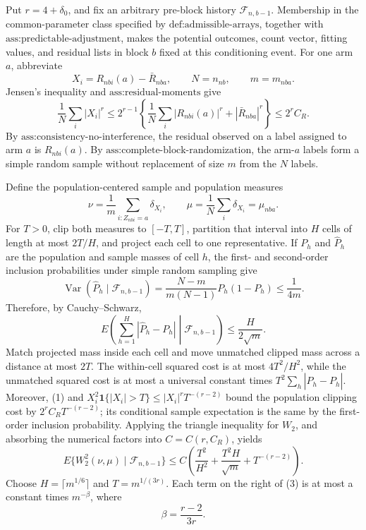 Put \(r=4+\delta_0\), and fix an arbitrary pre-block history \(\mathcal F_{n,b-1}\). Membership in the common-parameter class specified by \(\text{def:admissible-arrays}\), together with \(\text{ass:predictable-adjustment}\), makes the potential outcomes, count vector, fitting values, and residual lists in block \(b\) fixed at this conditioning event. For one arm \(a\), abbreviate
\[
X_i=R_{nbi}(a)-\bar R_{nba},\qquad N=n_{nb},\qquad m=m_{nba}.
\]
Jensen's inequality and \(\text{ass:residual-moments}\) give
\[
\frac1N\sum_i|X_i|^r
\le 2^{r-1}\left\{\frac1N\sum_i|R_{nbi}(a)|^r+|\bar R_{nba}|^r\right\}
\le 2^r C_R.
\tag{1}
\]
By \(\text{ass:consistency-no-interference}\), the residual observed on a label assigned to arm \(a\) is \(R_{nbi}(a)\). By \(\text{ass:complete-block-randomization}\), the arm-\(a\) labels form a simple random sample without replacement of size \(m\) from the \(N\) labels.

Define the population-centered sample and population measures
\[
\nu=\frac1m\sum_{i:Z_{nbi}=a}\delta_{X_i},
\qquad
\mu=\frac1N\sum_i\delta_{X_i}=\mu_{nba}.
\]
For \(T>0\), clip both measures to \([-T,T]\), partition that interval into \(H\) cells of length at most \(2T/H\), and project each cell to one representative. If \(P_h\) and \(\widehat P_h\) are the population and sample masses of cell \(h\), the first- and second-order inclusion probabilities under simple random sampling give
\[
\operatorname{Var}(\widehat P_h\mid\mathcal F_{n,b-1})
=\frac{N-m}{m(N-1)}P_h(1-P_h)\le\frac1{4m}.
\]
Therefore, by Cauchy--Schwarz,
\[
E\left(\sum_{h=1}^H|\widehat P_h-P_h|\middle|\mathcal F_{n,b-1}\right)
\le\frac{H}{2\sqrt m}.
\tag{2}
\]
Match projected mass inside each cell and move unmatched clipped mass across a distance at most \(2T\). The within-cell squared cost is at most \(4T^2/H^2\), while the unmatched squared cost is at most a universal constant times \(T^2\sum_h|\widehat P_h-P_h|\). Moreover, (1) and
\(X_i^2\mathbf 1\{|X_i|>T\}\le |X_i|^rT^{-(r-2)}\) bound the population clipping cost by \(2^rC_RT^{-(r-2)}\); its conditional sample expectation is the same by the first-order inclusion probability. Applying the triangle inequality for \(W_2\), and absorbing the numerical factors into \(C=C(r,C_R)\), yields
\[
E\{W_2^2(\nu,\mu)\mid\mathcal F_{n,b-1}\}
\le C\left(\frac{T^2}{H^2}+\frac{T^2H}{\sqrt m}+T^{-(r-2)}\right).
\tag{3}
\]
Choose \(H=\lceil m^{1/6}\rceil\) and \(T=m^{1/(3r)}\). Each term on the right of (3) is at most a constant times \(m^{-\beta}\), where
\[
\beta=\frac{r-2}{3r}.
\tag{4}
\]

